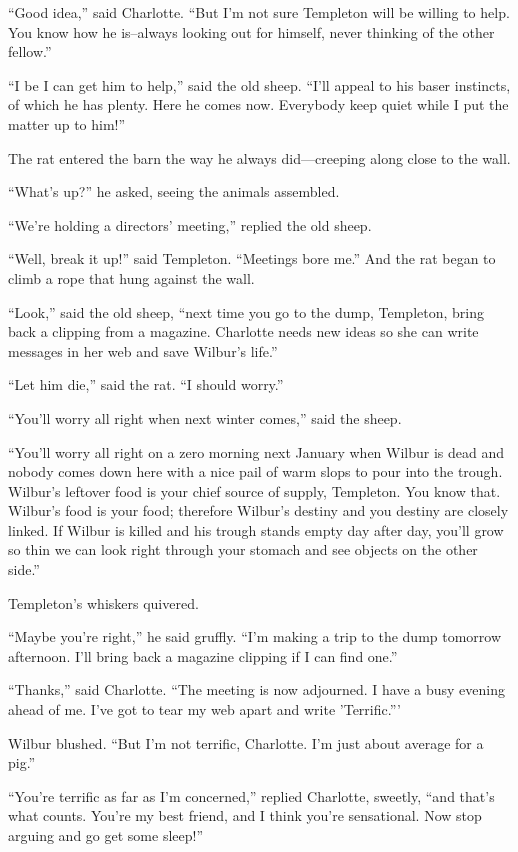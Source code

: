 \documentclass[a4paper, oneside]{book}
\begin{document}
``Good idea,'' said Charlotte. ``But I'm not sure Templeton will be
willing to help. You know how he is--always looking out for himself,
never thinking of the other fellow.''

``I be I can get him to help,'' said the old sheep. ``I'll appeal to his
baser instincts, of which he has plenty. Here he comes now.
Everybody keep quiet while I put the matter up to him!''

The rat entered the barn the way he always did---creeping along
close to the wall.

``What's up?'' he asked, seeing the animals assembled.

``We're holding a directors' meeting,'' replied the old sheep.

``Well, break it up!'' said Templeton. ``Meetings bore me.'' And the
rat began to climb a rope that hung against the wall.

``Look,'' said the old sheep, ``next time you go to the dump,
Templeton, bring back a clipping from a magazine. Charlotte needs
new ideas so she can write messages in her web and save Wilbur's
life.''

``Let him die,'' said the rat. ``I should worry.''

``You'll worry all right when next winter comes,'' said the sheep.

``You'll worry all right on a zero morning next January when
Wilbur is dead and nobody comes down here with a nice pail of
warm slops to pour into the trough. Wilbur's leftover food is your
chief source of supply, Templeton. You know that. Wilbur's food is
your food; therefore Wilbur's destiny and you destiny are closely
linked. If Wilbur is killed and his trough stands empty day after
day, you'll grow so thin we can look right through your stomach
and see objects on the other side.''

Templeton's whiskers quivered.

``Maybe you're right,'' he said gruffly. ``I'm making a trip to the
dump tomorrow afternoon. I'll bring back a magazine clipping if I
can find one.''

``Thanks,'' said Charlotte. ``The meeting is now adjourned. I have a
busy evening ahead of me. I've got to tear my web apart and write
'Terrific.'''

Wilbur blushed. ``But I'm not terrific, Charlotte. I'm just about
average for a pig.''

``You're terrific as far as I'm concerned,'' replied Charlotte, sweetly,
``and that's what counts. You're my best friend, and I think you're
sensational. Now stop arguing and go get some sleep!''
\end{document}
